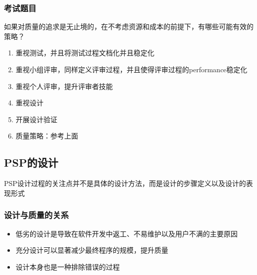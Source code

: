 \subsubsection{考试题目}
\begin{problem}
如果对质量的追求是无止境的，在不考虑资源和成本的前提下，有哪些可能有效的策略？
\vspace{-0.8em}
\begin{multicols}{2}
    \begin{enumerate}[label=\arabic*.]
        \item 重视测试，并且将测试过程文档化并且稳定化
        \item 重视小组评审，同样定义评审过程，并且使得评审过程的performance稳定化
        \item 重视个人评审，提升评审者技能
        \item 重视设计
        \item 开展设计验证
        \item 质量策略：参考上面
    \end{enumerate}
\end{multicols}
\vspace{-1em}
\end{problem}

\subsection{PSP的设计}
PSP设计过程的关注点并不是具体的设计方法，而是设计的步骤定义以及设计的表现形式

\subsubsection{设计与质量的关系}
\vspace{-0.8em}
\begin{multicols}{2}
    \begin{itemize}
        \item 低劣的设计是导致在软件开发中返工、不易维护以及用户不满的主要原因
        \item 充分设计可以显著减少最终程序的规模，提升质量
        \item 设计本身也是一种排除错误的过程
    \end{itemize}    
\end{multicols}
\vspace{-1em}

